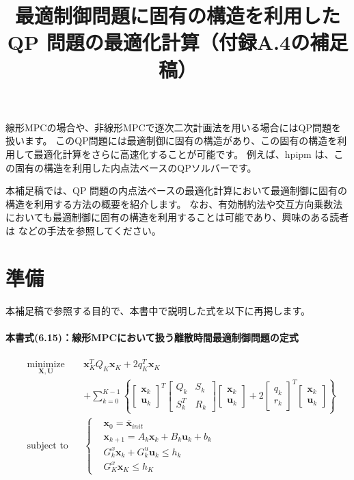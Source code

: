 \documentclass[a4paper]{jarticle}
\title{最適制御問題に固有の構造を利用した QP 問題の最適化計算（付録A.4の補足稿）}
\begin{document}
\maketitle

線形MPCの場合や、非線形MPCで逐次二次計画法を用いる場合にはQP問題を扱います。
このQP問題には最適制御に固有の構造があり、この固有の構造を利用して最適化計算をさらに高速化することが可能です。
例えば、hpipm \cite{frison2020hpipm}は、この固有の構造を利用した内点法ベースのQPソルバーです。


本補足稿では、QP 問題の内点法ベースの最適化計算において最適制御に固有の構造を利用する方法の概要を紹介します。
なお、有効制約法や交互方向乗数法においても最適制御に固有の構造を利用することは可能であり、興味のある読者は \cite{nielsen2017low,sokoler2014input} などの手法を参照してください。

\section*{準備}
本補足稿で参照する目的で、本書\cite{fukatsu2024python}中で説明した式を以下に再掲します。

\paragraph{本書\cite{fukatsu2024python}式(6.15)：線形MPCにおいて扱う離散時間最適制御問題の定式}

\begin{equation}
\begin{aligned}
& \underset{ {\mathbf{X}},{\mathbf{U}}}{\text{minimize}} && 
\mathbf{x}_K^TQ_K\mathbf{x}_K + 2 q_K^T\mathbf{x}_K
\\
&&&
+
\sum_{k=0}^{K-1}
\left\{
\begin{bmatrix} \mathbf{x}_k \\ \mathbf{u}_k\end{bmatrix}^T
\begin{bmatrix} Q_k & S_k \\ S_k^T & R_k \end{bmatrix}
\begin{bmatrix} \mathbf{x}_k \\ \mathbf{u}_k\end{bmatrix}
+
2\begin{bmatrix} q_k \\ r_k\end{bmatrix}^T
\begin{bmatrix} \mathbf{x}_k \\ \mathbf{u}_k\end{bmatrix}
\right\}
\\
&\text{subject to} && \left \{
\begin{aligned}
    & \mathbf{x}_0 = \bar{\mathbf{x}}_{init}\\
    & \mathbf{x}_{k+1} = A_k \mathbf{x}_k + B_k \mathbf{u}_k + b_k\\
    & G^{x}_k \mathbf{x}_k + G^{u}_k\mathbf{u}_k \le h_k\\
    & G^{x}_K\mathbf{x}_K\le h_K
\end{aligned}
\right .
\end{aligned}
\label{eq:ocp_qp}
\end{equation}
\end{document}

